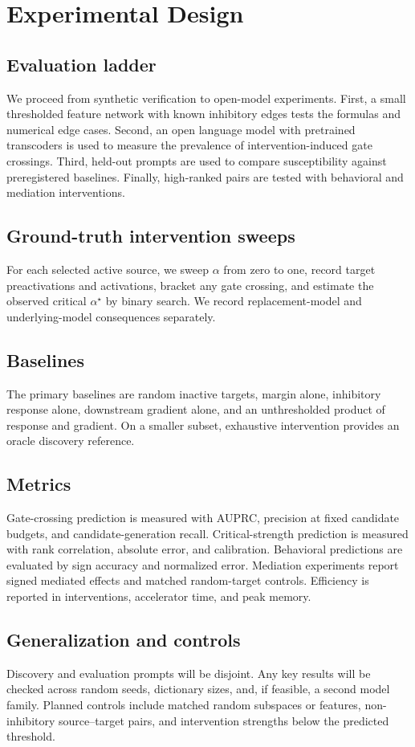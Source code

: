 \section{Experimental Design}
\label{sec:experiments}

\subsection{Evaluation ladder}

We proceed from synthetic verification to open-model experiments. First, a small thresholded feature network with known inhibitory edges tests the formulas and numerical edge cases. Second, an open language model with pretrained transcoders is used to measure the prevalence of intervention-induced gate crossings. Third, held-out prompts are used to compare susceptibility against preregistered baselines. Finally, high-ranked pairs are tested with behavioral and mediation interventions.

\subsection{Ground-truth intervention sweeps}

For each selected active source, we sweep $\alpha$ from zero to one, record target preactivations and activations, bracket any gate crossing, and estimate the observed critical $\alpha^\star$ by binary search. We record replacement-model and underlying-model consequences separately.

\subsection{Baselines}

The primary baselines are random inactive targets, margin alone, inhibitory response alone, downstream gradient alone, and an unthresholded product of response and gradient. On a smaller subset, exhaustive intervention provides an oracle discovery reference.

\subsection{Metrics}

Gate-crossing prediction is measured with AUPRC, precision at fixed candidate budgets, and candidate-generation recall. Critical-strength prediction is measured with rank correlation, absolute error, and calibration. Behavioral predictions are evaluated by sign accuracy and normalized error. Mediation experiments report signed mediated effects and matched random-target controls. Efficiency is reported in interventions, accelerator time, and peak memory.

\subsection{Generalization and controls}

Discovery and evaluation prompts will be disjoint. Any key results will be checked across random seeds, dictionary sizes, and, if feasible, a second model family. Planned controls include matched random subspaces or features, non-inhibitory source--target pairs, and intervention strengths below the predicted threshold.
